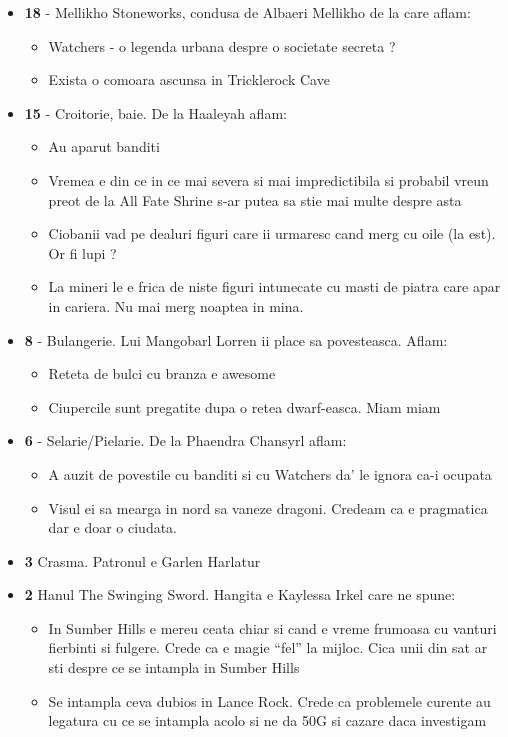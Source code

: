 \documentclass[12pt,twoside]{book}
\begin{document}
\begin{itemize}

	\item \textbf{18} - Mellikho Stoneworks, condusa de Albaeri Mellikho de la care aflam:
		\begin{itemize}
			\item Watchers - o legenda urbana despre o societate secreta ?
			\item Exista o comoara ascunsa in Tricklerock Cave
		\end{itemize}
		
	\item \textbf{15} - Croitorie, baie. De la Haaleyah aflam: 
		\begin{itemize}
			\item Au aparut banditi
			\item Vremea e din ce in ce mai severa si mai impredictibila si probabil vreun preot de la All Fate Shrine s-ar putea sa stie mai multe despre asta
			\item Ciobanii vad pe dealuri figuri care ii urmaresc cand merg cu oile (la est). Or fi lupi ?
			\item La mineri le e frica de niste figuri intunecate cu masti de piatra care apar in cariera. Nu mai merg noaptea in mina.
		\end{itemize}
		
	\item \textbf{8} - Bulangerie. Lui Mangobarl Lorren ii place sa povesteasca. Aflam:
		\begin{itemize}
			\item Reteta de bulci cu branza e awesome
			\item Ciupercile sunt pregatite dupa o retea dwarf-easca. Miam miam
		\end{itemize}
		
	\item \textbf{6} - Selarie/Pielarie. De la Phaendra Chansyrl aflam:
		\begin{itemize}
			\item A auzit de povestile cu banditi si cu Watchers da' le ignora ca-i ocupata
			\item Visul ei sa mearga in nord sa vaneze dragoni. Credeam ca e pragmatica dar e doar o ciudata.
		\end{itemize}
		
	\item \textbf{3} Crasma. Patronul e Garlen Harlatur
	
	\item \textbf{2} Hanul The Swinging Sword. Hangita e Kaylessa Irkel care ne spune:
		\begin{itemize}
			\item In Sumber Hills e mereu ceata chiar si cand e vreme frumoasa cu vanturi fierbinti si fulgere. Crede ca e magie ``fel'' la mijloc. Cica unii din sat ar sti despre ce se intampla in Sumber Hills
			\item Se intampla ceva dubios in Lance Rock. Crede ca problemele curente au legatura cu ce se intampla acolo si ne da 50G si cazare daca investigam
		\end{itemize}
		

\end{itemize}
\end{document}
